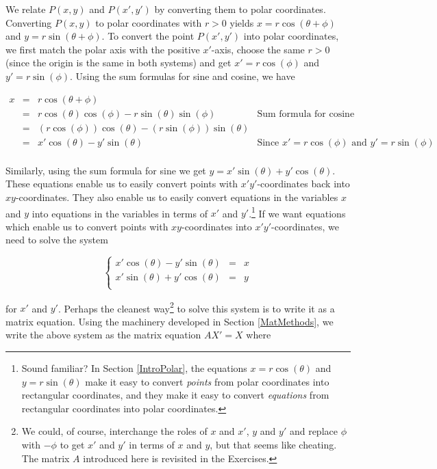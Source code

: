 We relate $P(x,y)$ and $P(x',y')$ by converting them to polar coordinates.  Converting $P(x,y)$ to polar coordinates with $r > 0$ yields $x = r\cos(\theta + \phi)$ and $y = r\sin(\theta + \phi)$.  To convert the point $P(x',y')$ into polar coordinates, we first match the polar axis with the positive $x'$-axis, choose the same $r>0$ (since the origin is the same in both systems) and get $x' = r\cos(\phi)$ and $y' = r\sin(\phi)$.  Using the sum formulas for sine and cosine, we have

\[ \begin{array}{rcll}

x & = & r\cos(\theta + \phi) & \\[3pt]
  & = & r\cos(\theta)\cos(\phi) - r\sin(\theta) \sin(\phi) & \text{Sum formula for cosine} \\[3pt]
  & = & (r\cos(\phi))\cos(\theta) - (r\sin(\phi))\sin(\theta) & \\[3pt]
  & = & x' \cos(\theta) - y' \sin(\theta) & \text{Since $x' = r\cos(\phi)$ and $y' = r\sin(\phi)$}\\ \end{array}\]

Similarly, using the sum formula for sine we get $y = x'\sin(\theta) + y'\cos(\theta)$.  These equations enable us to easily convert points with $x'y'$-coordinates back into $xy$-coordinates.  They also enable us to easily convert equations in the variables $x$ and $y$ into equations in the variables in terms of $x'$ and $y'$.\footnote{Sound familiar?  In Section \ref{IntroPolar}, the equations $x = r\cos(\theta)$ and $y = r\sin(\theta)$ make it easy to convert \textit{points} from polar coordinates into rectangular coordinates, and they make it easy to convert \textit{equations} from rectangular coordinates into polar coordinates.}  If we want equations which enable us to convert points with $xy$-coordinates into $x'y'$-coordinates, we need to solve the system

\vspace{-.05in}

\[ \left\{ \begin{array}{rcl} x' \cos(\theta) - y' \sin(\theta) & = & x \\ x'\sin(\theta) + y'\cos(\theta) & = & y \\ \end{array} \right.\]

for $x'$ and $y'$. Perhaps the cleanest way\footnote{We could, of course, interchange the roles of $x$ and $x'$, $y$ and $y'$ and replace $\phi$ with $-\phi$ to get $x'$ and $y'$ in terms of $x$ and $y$, but that seems like cheating.  The matrix $A$ introduced here is revisited in the Exercises.} to solve this system is to write it as a matrix equation. Using the machinery developed in Section \ref{MatMethods}, we write the above system as the matrix equation $AX' = X$ where

